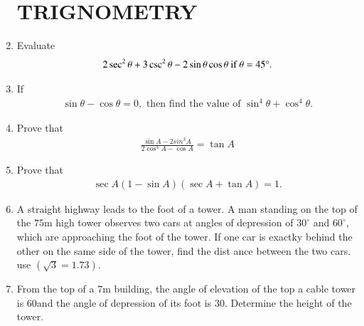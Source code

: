 \documentclass[12pt,-letter paper]{article}
\providecommand{\brak}[1]{\ensuremath{\left(#1\right)}}
\begin{document}
\begin{enumerate}
\section*{TRIGNOMETRY}
\item
Evaluate \begin{align}
2\sec^2\theta + 3\csc^2\theta - 2\sin\theta\cos\theta  \ \text{if} \ \theta = 45\degree.
\end{align}
\item 
If \begin{align} 
\sin\theta - \cos\theta = 0, \text{ then find the value of }\sin^4\theta + \cos^4\theta.
\end{align}
\item
Prove that \begin{align} \frac{\sin{A}-2sin^3{A}}{2\cos^3{A}-\cos{A}}=\tan{A} \end{align}
\item
Prove that \begin{align} \sec{A\brak{1-\sin{A}}\brak{\sec{A}+\tan{A}}}=1. \end{align}
\item
	A straight highway leads to the foot of a tower. A man standing on the top of the $75 \mathrm{m}$ high tower observes two cars at angles of depression of $30^\circ$ and $60^\circ$, which are approaching the foot of the tower. If one car is exactky behind the other on the same side of the tower, find the dist
ance between the two cars. use \brak{\sqrt{3}=1.73}.
\item
	From the top of a $7 \mathrm{m}$ building, the angle of elevation of the top a cable tower is 60\degree and the angle of depression of its foot is 30\degree. Determine the height of the tower.

\end{enumerate}
\end{document}
